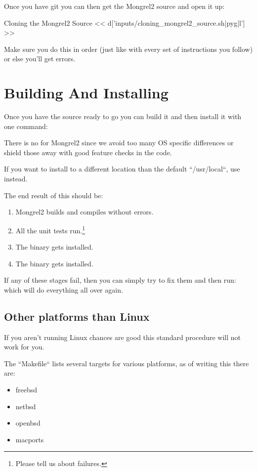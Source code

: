 Once you have git you can then get the Mongrel2 source and open it up:

\begin{code}{Cloning the Mongrel2 Source}
<< d['inputs/cloning_mongrel2_source.sh|pyg|l'] >>
\end{code}

Make sure you do this in order (just like with every set of instructions you follow)
or else you'll get errors.


\section{Building And Installing}

Once you have the source ready to go you can build it and then install it with
one command:  

There is no  for Mongrel2 since we avoid too many OS specific
differences or shield those away with good feature checks in the code.

If you want to install to a different location than the default  ``/usr/local``,
use  instead.

The end result of this should be:

\begin{enumerate}
\item Mongrel2 builds and compiles without errors.
\item All the unit tests run.\footnote{Please tell us about failures.}
\item The  binary gets installed.
\item The  binary gets installed.
\end{enumerate}

If any of these stages fail, then you can simply try to fix them and then
run:   which will do everything all over again.

\subsection{Other platforms than Linux}

If you aren't running Linux chances are good this standard procedure will not work for you.

The ``Makefile`` lists several targets for various platforms, as of writing this there are:

\begin{itemize}
\item freebsd
\item netbsd
\item openbsd
\item macports
\end{itemize}

